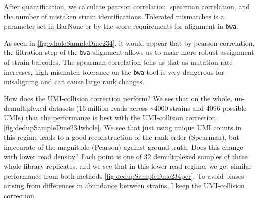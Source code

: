 After quantification, we calculate pearson correlation, spearman
correlation, and the number of mistaken strain identifications.
Tolerated mismatches is a parameter set in BarNone or by the score
requirements for alignment in \texttt{bwa}.

As seen in \autoref{fig:wholeSampleDme234}, 
it would appear that by pearson correlation, the filtration step of the
\texttt{bwa} alignment allows us to make more robust assignment of
strain barcodes. The spearman correlation tells us that as mutation rate
increases, high mismatch tolerance on the \texttt{bwa} tool is very
dangerous for misaligning and can cause large rank changes.


How does the UMI-collision correction perform?
We see that on the whole, un-demultiplexed datasets (16 million reads
across \textasciitilde{}4000 strains and 4096 possible UMIs) that the
performance is best with the UMI-collision correction 
\autoref{fig:dedupSampleDme234whole}. We see that just
using unique UMI counts in this regime leads to a good reconstruction of
the rank order (Spearman), but inaccurate of the magnitude (Pearson)
against ground truth.
Does this change with lower read density? 
Each point is one of 32 demultiplexed samples of three whole-library
replicates, and we see that in this lower read regime, we get similar
performance from both methods \autoref{fig:dedupSampleDme234per}.
To avoid biases arising from differences in abundance between strains,
I keep the UMI-collision correction.



